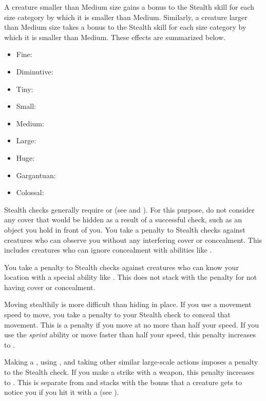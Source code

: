         A creature smaller than Medium size gains a  bonus to the Stealth skill for each size category by which it is smaller than Medium.
        Similarly, a creature larger than Medium size takes a  bonus to the Stealth skill for each size category by which it is smaller than Medium.
        These effects are summarized below.
            \begin{itemize}
                \item Fine: 
                \item Diminutive: 
                \item Tiny: 
                \item Small: 
                \item Medium: 
                \item Large: 
                \item Huge: 
                \item Gargantuan: 
                \item Colossal: 
            \end{itemize}

        Stealth checks generally require  or  (see  and ).
        For this purpose, do not consider any cover that would be hidden as a result of a successful check, such as an object you hold in front of you.
        You take a  penalty to Stealth checks against creatures who can observe you without any interfering cover or concealment.
        This includes creatures who can ignore concealment with abilities like .

        You take a  penalty to Stealth checks against creatures who can know your location with a special ability like .
        This does not stack with the penalty for not having cover or concealment.

        Moving stealthily is more difficult than hiding in place.
        If you use a movement speed to move, you take a penalty to your Stealth check to conceal that movement.
        This is a  penalty if you move at no more than half your speed.
        If you use the \textit{sprint} ability or move faster than half your speed, this penalty increases to .

        Making a , using , and taking other similar large-scale actions imposes a  penalty to the Stealth check.
        If you make a strike with a  weapon, this penalty increases to .
        This is separate from and stacks with the  bonus that a creature gets to notice you if you hit it with a  (see ).

